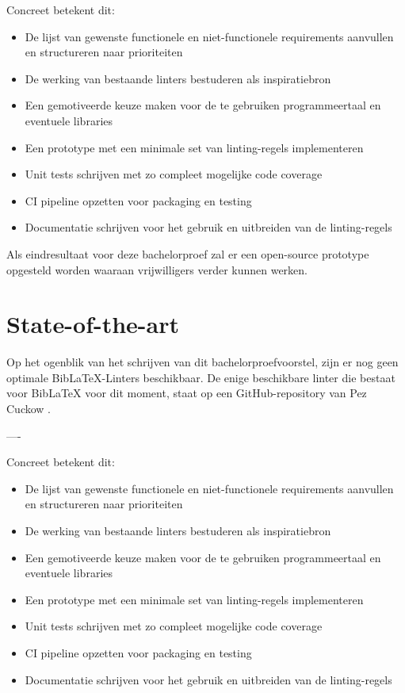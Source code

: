 Concreet betekent dit:
\begin{itemize}
  \item De lijst van gewenste functionele en niet-functionele requirements aanvullen en structureren naar prioriteiten
  \item De werking van bestaande linters bestuderen als inspiratiebron
  \item Een gemotiveerde keuze maken voor de te gebruiken programmeertaal en eventuele libraries
  \item Een prototype met een minimale set van linting-regels implementeren
  \item Unit tests schrijven met zo compleet mogelijke code coverage
  \item CI pipeline opzetten voor packaging en testing
  \item Documentatie schrijven voor het gebruik en uitbreiden van de linting-regels
\end{itemize}

Als eindresultaat voor deze bachelorproef zal er een open-source prototype opgesteld worden waaraan vrijwilligers verder kunnen werken.



\section{State-of-the-art}%
\label{sec:state-of-the-art}

Op het ogenblik van het schrijven van dit bachelorproefvoorstel, zijn er nog geen optimale BibLaTeX-Linters beschikbaar. De enige beschikbare linter die bestaat voor BibLaTeX voor dit moment, staat op een GitHub-repository van 
Pez Cuckow \autocite{Cuckow2022}. 


----

Concreet betekent dit:
\begin{itemize}
  \item De lijst van gewenste functionele en niet-functionele requirements aanvullen en structureren naar prioriteiten
  \item De werking van bestaande linters bestuderen als inspiratiebron
  \item Een gemotiveerde keuze maken voor de te gebruiken programmeertaal en eventuele libraries
  \item Een prototype met een minimale set van linting-regels implementeren
  \item Unit tests schrijven met zo compleet mogelijke code coverage
  \item CI pipeline opzetten voor packaging en testing
  \item Documentatie schrijven voor het gebruik en uitbreiden van de linting-regels
\end{itemize}

